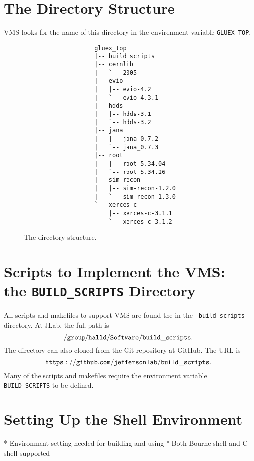 \documentclass[12pt]{article}
\begin{document}
\section{The Directory Structure}\label{section:directory}

VMS looks for the name of this directory in the environment variable {\tt GLUEX\_TOP}.

\begin{figure}
\begin{verbatim}
                    gluex_top
                    |-- build_scripts
                    |-- cernlib
                    |   `-- 2005
                    |-- evio
                    |   |-- evio-4.2
                    |   `-- evio-4.3.1
                    |-- hdds
                    |   |-- hdds-3.1
                    |   `-- hdds-3.2
                    |-- jana
                    |   |-- jana_0.7.2
                    |   `-- jana_0.7.3
                    |-- root
                    |   |-- root_5.34.04
                    |   `-- root_5.34.26
                    |-- sim-recon
                    |   |-- sim-recon-1.2.0
                    |   `-- sim-recon-1.3.0
                    `-- xerces-c
                        |-- xerces-c-3.1.1
                        `-- xerces-c-3.1.2
\end{verbatim}
\caption{The directory structure.}\label{fig:directory-tree}
\end{figure}

\section{Scripts to Implement the VMS: \\ the {\tt BUILD\_SCRIPTS} Directory}

All scripts and makefiles to support VMS are found the in the {\tt
  build\_scripts} directory. At JLab, the full path is
$${\tt /group/halld/Software/build\_scripts}.$$
The directory can also cloned from the Git repository at GitHub. The URL is
$${\tt https://github.com/jeffersonlab/build\_scripts}.$$
Many of the scripts and makefiles require the environment variable {\tt BUILD\_SCRIPTS} to be defined.

\section{Setting Up the Shell Environment}

* Environment setting needed for building and using
* Both Bourne shell and C shell supported
\end{document}
